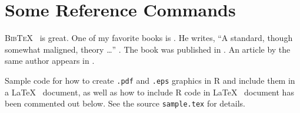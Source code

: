 \documentclass[12pt]{article}
\newcommand{\bibtex}{\textsc{Bib\TeX}}
\begin{document}
\section{Some Reference Commands}

\bibtex~ is great.  One of my favorite books is \cite{gill:06}.  He writes, ``A standard, though somewhat maligned, theory \ldots'' \citep[p.24]{gill:06}.  The book was published in \citeyear{gill:06}.  An article by the same author appears in \cite{gill:08}.  

Sample code for how to create {\tt .pdf} and {\tt .eps} graphics in R and include them in a \LaTeX~ document, as well as how to include R code in \LaTeX~ document has been commented out below.  See the source {\tt sample.tex} for details.




\singlespacing 


\end{document}

